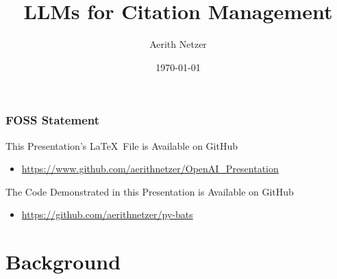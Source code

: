 \documentclass[aspectratio=169,9pt,xcolor=dvipsnames]{beamer}
\title[Intro]{LLMs for Citation Management} %
\author[Aerith Netzer]{Aerith Netzer} %
\institute[NU] %
{
Digital Publishing and Repository Librarian \\ %
\medskip
Northwestern University Libraries \\ %
\medskip
\textit{aerith.netzer@northwestern.edu} %
}
\date{\today} %
\begin{document}
\begin{frame}
\titlepage %
\end{frame}


\begin{frame}
    \frametitle{FOSS Statement}
    \begin{block}{This Presentation's \LaTeX\ File is Available on GitHub}
        \begin{itemize}
            \item \url{https://www.github.com/aerithnetzer/OpenAI_Presentation}
        \end{itemize}
    \end{block}
    \begin{block}{The Code Demonstrated in this Presentation is Available on GitHub}
        \begin{itemize}
            \item \url{https://github.com/aerithnetzer/py-bats}
        \end{itemize}
    \end{block}
    \end{frame}
\section{Background} %
\end{document}
